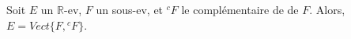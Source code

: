Soit $E$ un $\mathbb R$-ev, $F$ un sous-ev, et ${}^c F$ le complémentaire de de $F$. Alors, $E = Vect\{F,{}^c F\}$.

\begin{reponses}
\end{reponses}


